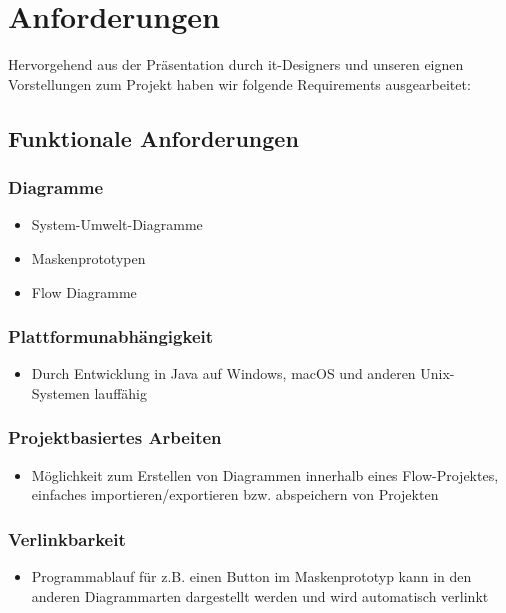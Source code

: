 \section{Anforderungen}
Hervorgehend aus der Präsentation durch it-Designers und unseren eignen Vorstellungen zum Projekt haben wir folgende Requirements ausgearbeitet:

\subsection{Funktionale Anforderungen}

\subsubsection{Diagramme}
\begin{itemize}
	\item System-Umwelt-Diagramme
	\item Maskenprototypen
	\item Flow Diagramme
\end{itemize}

\subsubsection{Plattformunabhängigkeit}
\begin{itemize}
	\item Durch Entwicklung in Java auf Windows, macOS und anderen Unix-Systemen lauffähig
\end{itemize}

\subsubsection{Projektbasiertes Arbeiten}
\begin{itemize}
	\item Möglichkeit zum Erstellen von Diagrammen innerhalb eines Flow-Projektes, einfaches importieren/exportieren bzw. abspeichern von Projekten
\end{itemize}

\subsubsection{Verlinkbarkeit}
\begin{itemize}
	\item Programmablauf für z.B. einen Button im Maskenprototyp kann in den anderen Diagrammarten dargestellt werden und wird automatisch verlinkt 
\end{itemize}

